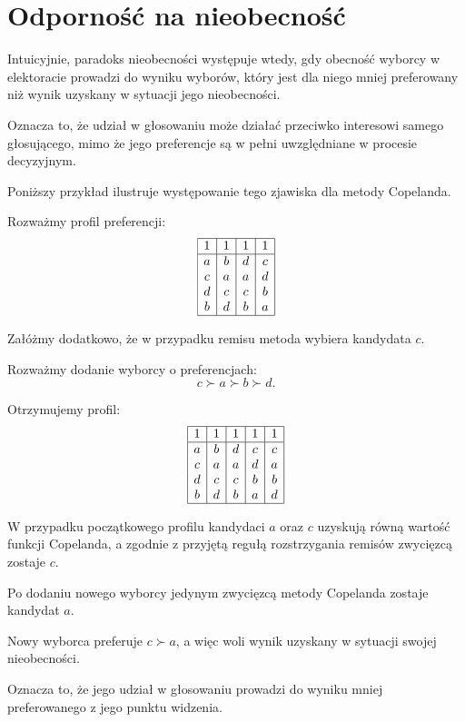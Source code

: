 \documentclass[12pt,a4paper]{mwrep}
\begin{document}
	\section{Odporność na nieobecność}
	
	Intuicyjnie, paradoks nieobecności występuje wtedy, gdy obecność wyborcy w elektoracie prowadzi do wyniku wyborów, który jest dla niego mniej preferowany niż wynik uzyskany w sytuacji jego nieobecności.
	
	Oznacza to, że udział w głosowaniu może działać przeciwko interesowi samego głosującego, mimo że jego preferencje są w pełni uwzględniane w procesie decyzyjnym.
	
	\medskip
	
	Poniższy przykład ilustruje występowanie tego zjawiska dla metody Copelanda.
	
	\begin{example}
		Rozważmy profil preferencji:
		\[
		\begin{array}{|c|c|c|c|}
			\hline
			1 & 1 & 1 & 1\\
			\hline
			a & b & d & c\\
			c & a & a & d\\
			d & c & c & b\\
			b & d & b & a\\
			\hline
		\end{array}
		\]
		
		Załóżmy dodatkowo, że w przypadku remisu metoda wybiera kandydata \(c\).
		
		Rozważmy dodanie wyborcy o preferencjach:
		\[
		c \succ a \succ b \succ d.
		\]
		
		Otrzymujemy profil:
		\[
		\begin{array}{|c|c|c|c|c|}
			\hline
			1 & 1 & 1 & 1 & 1\\
			\hline
			a & b & d & c & c\\
			c & a & a & d & a\\
			d & c & c & b & b\\
			b & d & b & a & d\\
			\hline
		\end{array}
		\]
		
		W przypadku początkowego profilu kandydaci \(a\) oraz \(c\) uzyskują równą wartość funkcji Copelanda, a zgodnie z przyjętą regułą rozstrzygania remisów zwycięzcą zostaje \(c\).
		
		Po dodaniu nowego wyborcy jedynym zwycięzcą metody Copelanda zostaje kandydat \(a\).
		
		Nowy wyborca preferuje \(c \succ a\), a więc woli wynik uzyskany w sytuacji swojej nieobecności.
		
		Oznacza to, że jego udział w głosowaniu prowadzi do wyniku mniej preferowanego z jego punktu widzenia.
	\end{example}
	
\end{document}
